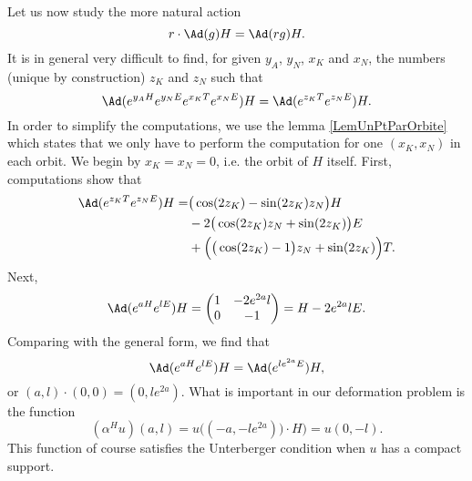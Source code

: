 Let us now study the more natural action
\begin{equation}
  r\cdot \Ad(g)H=\Ad(rg)H.
\end{equation}
It is in general very difficult to find, for given $y_A$, $y_N$, $x_K$ and $x_N$, the numbers (unique by construction) $z_K$ and $z_N$ such that 
\[ 
  \Ad( e^{y_AH} e^{y_NE} e^{x_KT} e^{x_NE})H=\Ad( e^{z_KT} e^{z_NE})H.
\]
In order to simplify the computations, we use the lemma \ref{LemUnPtParOrbite} which states that we only have to perform the computation for one $(x_K,x_N)$ in each orbit. We begin by $x_K=x_N=0$, i.e. the orbit of $H$ itself. First, computations show that 
\[ 
\begin{split}
\Ad( e^{z_KT} e^{z_NE})H=&\big( \cos(2z_K)-\sin(2z_K)z_N \big)H\\
			&-2\big( \cos(2z_K)z_N+\sin(2z_K) \big)E\\
			&+\Big( \big( \cos(2z_K)-1 \big)z_N+\sin(2z_K) \Big)T.
\end{split}  
\]
Next, 
\[ 
  \Ad( e^{aH} e^{lE})H=\begin{pmatrix}
1&-2 e^{2a}l\\
0& -1
\end{pmatrix}
=H-2 e^{2a}lE.
\]
Comparing with the general form, we find that
\begin{equation}
\Ad( e^{aH} e^{lE})H=\Ad( e^{l e^{2a}E})H,
\end{equation}
or $(a,l)\cdot (0,0)=(0,l e^{2a})$. What is important in our deformation problem is the function
\[ 
  (\alpha^Hu)(a,l)=u\big( (-a,-l e^{2a}))\cdot H \big)=u(0,-l).
\]
This function of course satisfies the Unterberger condition when $u$ has a compact support.

